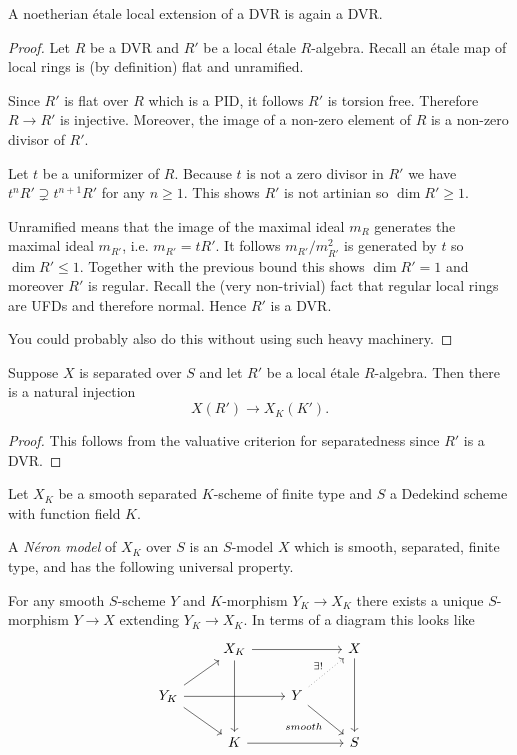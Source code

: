 \documentclass[11pt]{article}
\newcommand{\neron}{N\'{e}ron }
\newcommand{\etale}{\'{e}tale }
\begin{document}
\begin{lem}\label{etaledvr}
	A noetherian \etale local extension of a DVR is again a DVR.
\end{lem}
\begin{proof}
	Let $R$ be a DVR and $R'$ be a local \etale $R$-algebra. Recall an \etale map of local rings is (by definition) flat and unramified.
	
	Since $R'$ is flat over $R$ which is a PID, it follows $R'$ is torsion free. Therefore $R \to R'$ is injective. Moreover, the image of a non-zero element of $R$ is a non-zero divisor of $R'$.
	
	Let $t$ be a uniformizer of $R$. Because $t$ is not a zero divisor in $R'$ we have $t^nR' \supsetneq t^{n+1}R'$ for any $n\geq 1$. This shows $R'$ is not artinian so $\dim R' \geq 1$.
	
	Unramified means that the image of the maximal ideal $m_R$ generates the maximal ideal $m_{R'}$, i.e. $m_{R'} = tR'$. It follows $m_{R'}/m_{R'}^2$ is generated by $t$ so $\dim R' \leq 1$. Together with the previous bound this shows $\dim R' = 1$ and moreover $R'$ is regular. Recall the (very non-trivial) fact that regular local rings are UFDs and therefore normal. Hence $R'$ is a DVR.
	
	You could probably also do this without using such heavy machinery.
\end{proof}

\begin{cor}\label{maponpointsalwaysinjectiveifseparated}
	Suppose $X$ is separated over $S$ and let $R'$ be a local \etale $R$-algebra. Then there is a natural injection
	$$
	X(R') \to X_K(K').
	$$
\end{cor}
\begin{proof}
	This follows from the valuative criterion for separatedness since $R'$ is a DVR.
\end{proof}

\begin{defn}
	Let $X_K$ be a smooth separated $K$-scheme of finite type and $S$ a Dedekind scheme with function field $K$.
	
	A \emph{\neron model} of $X_K$ over $S$ is an $S$-model $X$ which is smooth, separated, finite type, and has the following universal property.
	
	For any smooth $S$-scheme $Y$ and $K$-morphism $Y_K \to X_K$ there exists a unique $S$-morphism $Y \to X$ extending $Y_K \to X_K$. In terms of a diagram this looks like
	$$
	\begin{tikzcd}
		\, & X_K \ar{rr}\ar{dd} & & X \ar{dd}
		\\
		Y_K \ar{rr}\ar{dr}\urar & & Y \ar{dr}[swap]{smooth}\urar[dotted]{\exists!}
		\\
		& K \ar{rr} & & S
	\end{tikzcd}
	$$
\end{defn}
\end{document}
